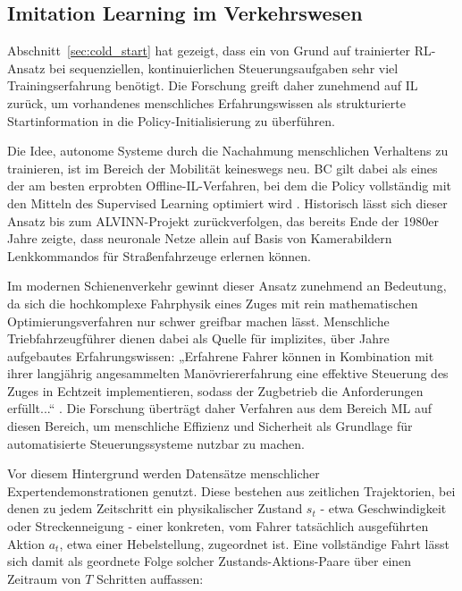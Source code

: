 \subsection{Imitation Learning im Verkehrswesen}
\label{sec:imitation_learning}

Abschnitt~\ref{sec:cold_start} hat gezeigt, dass ein von Grund auf trainierter \gls{RL}-Ansatz bei sequenziellen, kontinuierlichen Steuerungsaufgaben sehr viel Trainingserfahrung benötigt. Die Forschung greift daher zunehmend auf \gls{IL} zurück, um vorhandenes menschliches Erfahrungswissen als strukturierte Startinformation in die Policy-Initialisierung zu überführen.

Die Idee, autonome Systeme durch die Nachahmung menschlichen Verhaltens zu trainieren, ist im Bereich der Mobilität keineswegs neu. \gls{BC} gilt dabei als eines der am besten erprobten Offline-\gls{IL}-Verfahren, bei dem die Policy vollständig mit den Mitteln des Supervised Learning optimiert wird \cite[vgl.~S.~2]{chap3_Sha24}. Historisch lässt sich dieser Ansatz bis zum \gls{ALVINN}-Projekt zurückverfolgen, das bereits Ende der 1980er Jahre zeigte, dass neuronale Netze allein auf Basis von Kamerabildern Lenkkommandos für Straßenfahrzeuge erlernen können.

Im modernen Schienenverkehr gewinnt dieser Ansatz zunehmend an Bedeutung, da sich die hochkomplexe Fahrphysik eines Zuges mit rein mathematischen Optimierungsverfahren nur schwer greifbar machen lässt. Menschliche Triebfahrzeugführer dienen dabei als Quelle für implizites, über Jahre aufgebautes Erfahrungswissen: „Erfahrene Fahrer können in Kombination mit ihrer langjährig angesammelten Manövriererfahrung eine effektive Steuerung des Zuges in Echtzeit implementieren, sodass der Zugbetrieb die Anforderungen erfüllt...“ \cite[S.~8]{chap1_Huang25}. Die Forschung überträgt daher Verfahren aus dem Bereich \gls{ML} auf diesen Bereich, um menschliche Effizienz und Sicherheit als Grundlage für automatisierte Steuerungssysteme nutzbar zu machen.

Vor diesem Hintergrund werden Datensätze menschlicher Expertendemonstrationen genutzt. Diese bestehen aus zeitlichen Trajektorien, bei denen zu jedem Zeitschritt ein physikalischer Zustand $s_t$ - etwa Geschwindigkeit oder Streckenneigung - einer konkreten, vom Fahrer tatsächlich ausgeführten Aktion $a_t$, etwa einer Hebelstellung, zugeordnet ist. Eine vollständige Fahrt lässt sich damit als geordnete Folge solcher Zustands-Aktions-Paare über einen Zeitraum von $T$ Schritten auffassen:

